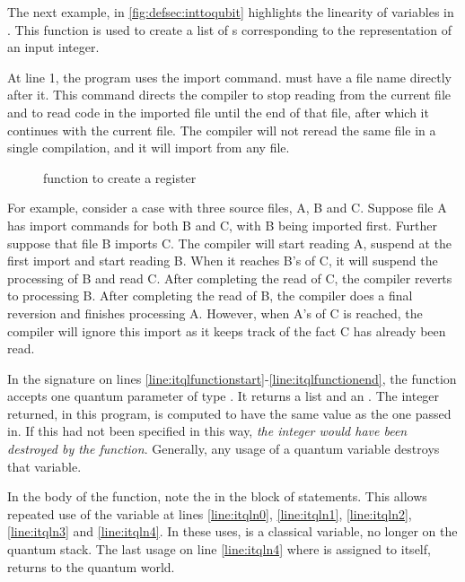 The next example, in \vref{fig:defsec:inttoqubit}
 highlights the linearity of variables in \lqpl. This function is 
 used to create a list of \qubit{}s corresponding to the
\bit{} representation of an input integer.

At line 1,  the program uses the import command.
 must have a file name directly after it. This 
command directs the compiler to stop reading from the current file
and to read  code in the imported file until the end of that
file, after which it  continues with the current 
file.  The compiler will not reread the same file in a single
 compilation, and it will import from any file.


\begin{figure}[htbp]
\begin{singlespace}

\end{singlespace}
\caption{\lqpl{} function to create a \qubit{} register}
\label{fig:defsec:inttoqubit}
\end{figure}

For example, consider a case with three source files, A, B and C.
Suppose file A has import commands for both B and  C, with B being
imported first. Further suppose that  file B 
 imports C. The compiler will start reading A, suspend at the first 
import and start reading B. When it reaches B's  of C, it
will suspend the processing of B and read C. 
After completing the read of C, the compiler
reverts to processing B.
After completing the read of B, the compiler does a 
final reversion and finishes  processing  A. 
However, when A's  of C
is reached, the compiler will ignore this import
 as it keeps track of the fact C has
already been read.

In the signature on lines 
\ref{line:itqlfunctionstart}-\ref{line:itqlfunctionend},  
the function accepts
one quantum parameter of type . It returns
a   list and an . The integer returned, in
this program, is computed to have 
the same value as the one passed in. If this had not been
specified in this way, 
\emph{the integer would have been destroyed by the function}.  Generally, any usage
of a quantum variable destroys that variable. 

In the body of the function, note the  in the
 block of statements. This allows  repeated 
use of the variable  at lines \ref{line:itqln0}, \ref{line:itqln1},
\ref{line:itqln2}, \ref{line:itqln3} and \ref{line:itqln4}. In these uses,
 is a classical variable, no longer on the quantum stack. The last
usage on line \ref{line:itqln4} where  is assigned to itself, 
returns  to the quantum world.



